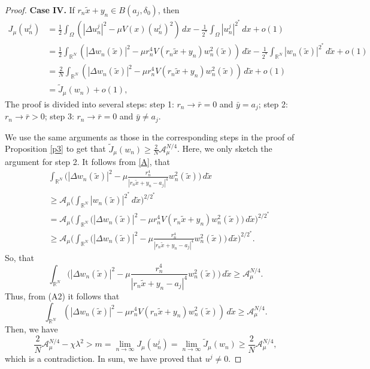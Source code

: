 \documentclass[10pt,a4paper]{amsart}
\numberwithin{equation}{section}
\begin{document}
\begin{proof}
\noindent\textbf{Case IV.} If \(r_n\tilde{x}+y_n \in B(a_j, \delta_0)\), then
\begin{align*}
 J_{\mu}(u_n^j)&=\frac{1}{2}\int_{\Omega}(|\Delta u_n^j|^2-\mu V(x)(u_n^j)^2)\,dx-\frac{1}{2^*} \int_{\Omega} |u_n^j|^{2^*}\,dx+o(1)\\
 &=\frac{1}{2}\int_{\mathbb{R}^N}\left( |\Delta w_n(\tilde{x})|^2-\mu r_n^4 V(r_n\tilde{x}+y_n)w_n^2(\tilde{x})\right)\,d\tilde{x}-\frac{1}{2^*}\int _{\mathbb{R}^N}|w_n(\tilde{x})|^{2^*}\,d\tilde{x}+o(1)\\
 &=\frac{2}{N}\int_{\mathbb{R}^N}\left( |\Delta w_n(\tilde{x})|^2-\mu r_n^4 V(r_n\tilde{x}+y_n)w_n^2(\tilde{x})\right)\,d\tilde{x}+o(1)\\
 &=\tilde{J}_\mu(w_n)+o(1),
\end{align*}
The proof is divided into several steps:
step 1: \(r_n\to \bar{r}=0\) and \(\bar {y}=a_j\);
step 2: \(r_n\to \bar{r}>0\);
step 3: \(r_n\to \bar{r}=0\) and \(\bar {y}\neq a_j\).

We use the same arguments as those in the corresponding steps in the proof of 
Proposition \ref{p3} to get that 
$\tilde{J}_\mu(w_n)\geq \frac{2}{N}\mathcal{A}_{\mu}^{N/4}$.
Here, we only sketch the argument for step 2. 
It follows from \eqref{A}, that
\begin{align*}
 &\int_{\mathbb{R}^N}\Big( |\Delta w_n(\tilde{x})|^2-\mu \frac{r_n^4}{\left| 
  r_{n}\tilde{x}+y_n-a_j\right| ^4}w_n^2(\tilde{x})\Big)\,d\tilde{x}\\
 &\geq \mathcal{A}_{\mu} \Big( \int _{\mathbb{R}^N}|w_n(\tilde{x})|^{2^*}\,d\tilde{x}
  \Big) ^{2/2^*}\\
 &=\mathcal{A}_{\mu} \Big(\int_{\mathbb{R}^N} 
  \Big( |\Delta w_n(\tilde{x})|^2-\mu r_n^4 V(r_n\tilde{x}+y_n)w_n^2(\tilde{x})\Big) 
  \,d\tilde{x}\Big)^{2/2^*}\\
 &\geq \mathcal{A}_{\mu} \Big(\int_{\mathbb{R}^N}
 \Big( |\Delta w_n(\tilde{x})|^2-\mu \frac{r_n^4}{\left| r_{n}\tilde{x}
  +y_n-a_j\right| ^4}w_n^2(\tilde{x})\Big)\, d\tilde{x}\Big)^{2/2^*}. 
\end{align*}
So, that
\[
 \int_{\mathbb{R}^N}\Big( |\Delta w_n(\tilde{x})|^2-\mu \frac{r_n^4}
 {\left| r_{n}\tilde{x}+y_n-a_j\right| ^4}w_n^2(\tilde{x})\Big)\,d\tilde{x}
 \geq \mathcal{A}_{\mu}^{N/4}.
\]
Thus, from (A2) it follows that
\[
 \int_{\mathbb{R}^N}\left( |\Delta w_n(\tilde{x})|^2-\mu r_n^4 V(r_n\tilde{x}+y_n)w_n^2(\tilde{x})\right)\, d\tilde{x}
 \geq \mathcal{A}_{\mu}^{N/4}.
\]
Then, we have
 \[
 \frac{2}{N}\mathcal{A}_{\mu}^{N/4}-\chi \lambda^2> m
 =\lim_{n\to \infty}J_\mu (u_n^j)=\lim_{n\to \infty}\tilde{J}_\mu(w_n)
 \geq \frac{2}{N}\mathcal{A}_{\mu}^{N/4},
 \]
 which is a contradiction. In sum, we have proved that \(u^j\neq 0\).
 

\end{proof}
\end{document}
